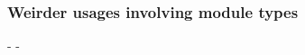 \subsubsection{Weirder usages involving module types\label{Ocamlary-weirder-usages-involving-module-types}}%
\begin{description}\kern-\topsep
\makeatletter\advance\@topsepadd-\topsep\makeatother%
\item[{\hyperref[Ocamlary-IncludeInclude1-IncludeInclude2_M]{\ocamlinlinecode{\ocamlinlinecode{IncludeInclude1.\allowbreak{}IncludeInclude2\_\allowbreak{}M}}[p\pageref*{Ocamlary-IncludeInclude1-IncludeInclude2_M}]}}]{}%
\item[{\hyperref[Ocamlary-Dep4-X]{\ocamlinlinecode{\ocamlinlinecode{Dep4.\allowbreak{}X}}[p\pageref*{Ocamlary-Dep4-X}]}}]{}\end{description}%
